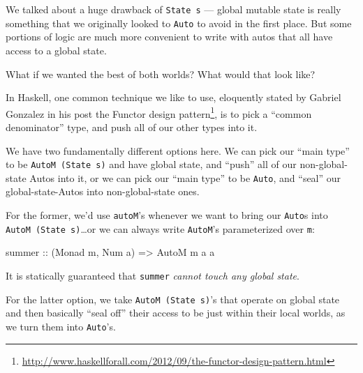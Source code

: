 \documentclass[]{article}
\newenvironment{Shaded}{}{}
\newcommand{\DataTypeTok}[1]{\textcolor[rgb]{0.56,0.13,0.00}{{#1}}}
\newcommand{\OtherTok}[1]{\textcolor[rgb]{0.00,0.44,0.13}{{#1}}}
\newcommand{\NormalTok}[1]{{#1}}
\renewcommand{\href}[2]{#2\footnote{\url{#1}}}
\begin{document}
We talked about a huge drawback of \texttt{State\ s} --- global mutable
state is really something that we originally looked to \texttt{Auto} to
avoid in the first place. But some portions of logic are much more
convenient to write with autos that all have access to a global state.

What if we wanted the best of both worlds? What would that look like?

In Haskell, one common technique we like to use, eloquently stated by
Gabriel Gonzalez in his post
\href{http://www.haskellforall.com/2012/09/the-functor-design-pattern.html}{the
Functor design pattern}, is to pick a ``common denominator'' type, and
push all of our other types into it.

We have two fundamentally different options here. We can pick our ``main
type'' to be \texttt{AutoM\ (State\ s)} and have global state, and
``push'' all of our non-global-state Autos into it, or we can pick our
``main type'' to be \texttt{Auto}, and ``seal'' our global-state-Autos
into non-global-state ones.

For the former, we'd use \texttt{autoM}'s whenever we want to bring our
\texttt{Auto}s into \texttt{AutoM\ (State\ s)}\ldots{}or we can always
write \texttt{AutoM}'s parameterized over \texttt{m}:

\begin{Shaded}
\begin{Highlighting}[]
\OtherTok{summer ::} \NormalTok{(}\DataTypeTok{Monad} \NormalTok{m, }\DataTypeTok{Num} \NormalTok{a) }\OtherTok{=>} \DataTypeTok{AutoM} \NormalTok{m a a}
\end{Highlighting}
\end{Shaded}

It is statically guaranteed that \texttt{summer} \emph{cannot touch any
global state}.

For the latter option, we take \texttt{AutoM\ (State\ s)}'s that operate
on global state and then basically ``seal off'' their access to be just
within their local worlds, as we turn them into \texttt{Auto}'s.
\end{document}
